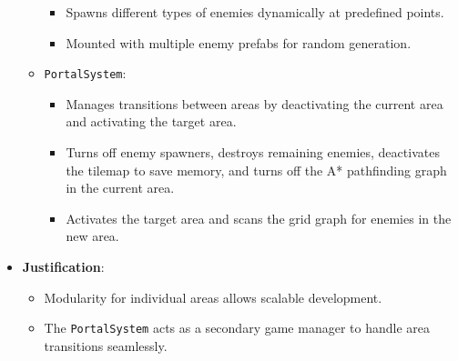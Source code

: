 \documentclass[10pt,twocolumn]{article}
\begin{document}
\begin{itemize}
\begin{itemize}
\begin{itemize}
            \item Spawns different types of enemies dynamically at predefined points.
            \item Mounted with multiple enemy prefabs for random generation.
        \end{itemize}
        \item \texttt{PortalSystem}:
        \begin{itemize}
            \item Manages transitions between areas by deactivating the current area and activating the target area.
            \item Turns off enemy spawners, destroys remaining enemies, deactivates the tilemap to save memory, and turns off the A* pathfinding graph in the current area.
            \item Activates the target area and scans the grid graph for enemies in the new area.
        \end{itemize}
    \end{itemize}
    \item \textbf{Justification}:
    \begin{itemize}
        \item Modularity for individual areas allows scalable development.
        \item The \texttt{PortalSystem} acts as a secondary game manager to handle area transitions seamlessly.
    \end{itemize}
\end{itemize}
\end{document}
